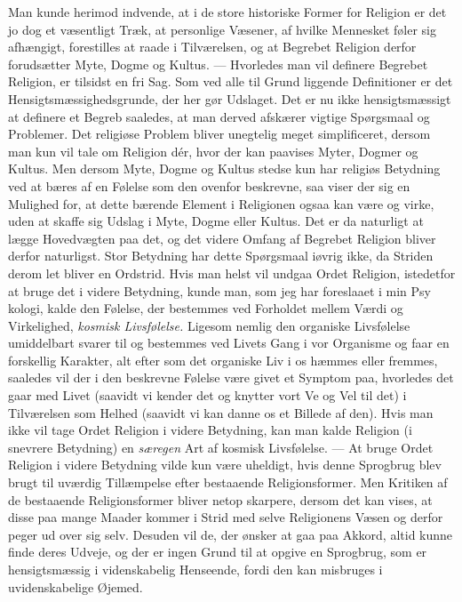\documentclass[12pt,a4paper,openany]{book}
\newcommand{\opage}[1]{\marginnote{\footnotesize\textit{[#1]}}}
\begin{document}
Man kunde herimod indvende, at i de store historiske Former for Religion
er det jo dog et væsentligt Træk, at personlige Væsener, af hvilke
Mennesket føler sig afhængigt, forestilles at raade i Tilværelsen, og at
Begrebet Religion derfor forudsætter Myte, Dogme og Kultus. ---
Hvorledes man vil definere Begrebet Religion, er tilsidst en fri Sag.
Som ved alle til Grund liggende Definitioner er det
Hensigtsmæssighedsgrunde, der her gør Udslaget. Det er nu ikke
hensigtsmæssigt at definere et Begreb saaledes, at man derved afskærer
vigtige Spørgsmaal og Problemer. Det religiøse Problem bliver unegtelig
meget simplificeret, dersom man kun vil tale om Religion dér, hvor der
kan paavises Myter, Dogmer og Kultus. Men dersom Myte, Dogme og Kultus
stedse kun har religiøs Betydning ved at bæres af en Følelse som den
ovenfor beskrevne, saa viser der sig en Mulighed for, at dette bærende
Element i Religionen ogsaa kan være og virke, uden at skaffe sig Udslag
i Myte, Dogme eller Kultus. Det er da naturligt at lægge Hovedvægten paa
det, og det videre Omfang af Begrebet Religion bliver derfor naturligst.
Stor Betydning har dette Spørgsmaal iøvrig ikke, da Striden derom let
bliver en Ordstrid. Hvis man helst vil undgaa Ordet Religion, istedetfor
at bruge det i videre Betydning, kunde man, som jeg har foreslaaet i min
Psy%
\opage{65}kologi, kalde den Følelse, der bestemmes ved Forholdet mellem
Værdi og Virkelighed, \textit{kosmisk Livsfølelse.} Ligesom nemlig den
organiske Livsfølelse umiddelbart svarer til og bestemmes ved Livets
Gang i vor Organisme og faar en forskellig Karakter, alt efter som det
organiske Liv i os hæmmes eller fremmes, saaledes vil der i den
beskrevne Følelse være givet et Symptom paa, hvorledes det gaar med
Livet (saavidt vi kender det og knytter vort Ve og Vel til det) i
Tilværelsen som Helhed (saavidt vi kan danne os et Billede af den). Hvis
man ikke vil tage Ordet Religion i videre Betydning, kan man kalde
Religion (i snevrere Betydning) en \textit{særegen} Art af kosmisk
Livsfølelse. --- At bruge Ordet Religion i videre Betydning vilde kun
være uheldigt, hvis denne Sprogbrug blev brugt til uværdig Tillæmpelse
efter bestaaende Religionsformer. Men Kritiken af de bestaaende
Religionsformer bliver netop skarpere, dersom det kan vises, at disse
paa mange Maader kommer i Strid med selve Religionens Væsen og derfor
peger ud over sig selv. Desuden vil de, der ønsker at gaa paa Akkord,
altid kunne finde deres Udveje, og der er ingen Grund til at opgive en
Sprogbrug, som er hensigtsmæssig i videnskabelig Henseende, fordi den
kan misbruges i uvidenskabelige Øjemed.
\end{document}

